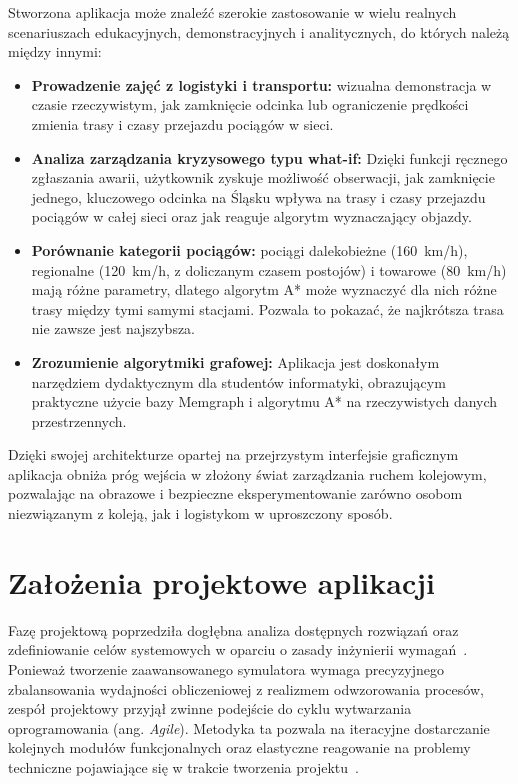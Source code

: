 \documentclass[twoside]{projektInzynierskiMS1z}
\begin{document}
Stworzona aplikacja może znaleźć szerokie zastosowanie w wielu realnych scenariuszach
edukacyjnych, demonstracyjnych i analitycznych, do których należą między innymi:

\begin{itemize}
\item \textbf{Prowadzenie zajęć z logistyki i transportu:} wizualna demonstracja
w czasie rzeczywistym, jak zamknięcie odcinka lub ograniczenie prędkości zmienia
trasy i czasy przejazdu pociągów w sieci.

\item \textbf{Analiza zarządzania kryzysowego typu what-if:} Dzięki funkcji ręcznego zgłaszania awarii, użytkownik zyskuje możliwość obserwacji,
jak zamknięcie jednego, kluczowego odcinka na Śląsku wpływa na trasy i czasy przejazdu pociągów w całej sieci oraz jak reaguje algorytm wyznaczający objazdy.

\item \textbf{Porównanie kategorii pociągów:} pociągi dalekobieżne (160~km/h),
regionalne (120~km/h, z doliczanym czasem postojów) i towarowe (80~km/h) mają
różne parametry, dlatego algorytm A* może wyznaczyć dla nich różne trasy między
tymi samymi stacjami. Pozwala to pokazać, że najkrótsza trasa nie zawsze jest
najszybsza.

\item \textbf{Zrozumienie algorytmiki grafowej:} Aplikacja jest doskonałym narzędziem
dydaktycznym dla studentów informatyki, obrazującym praktyczne użycie bazy Memgraph
i algorytmu A* na rzeczywistych danych przestrzennych.
\end{itemize}

Dzięki swojej architekturze opartej na przejrzystym interfejsie graficznym aplikacja
obniża próg wejścia w złożony świat zarządzania ruchem kolejowym, pozwalając na obrazowe i
bezpieczne eksperymentowanie zarówno osobom niezwiązanym z koleją, jak i logistykom w uproszczony sposób.

\section{Założenia projektowe aplikacji}

Fazę projektową poprzedziła dogłębna analiza dostępnych rozwiązań
oraz zdefiniowanie celów systemowych w oparciu o zasady inżynierii
wymagań~\cite{sommerville2016}. Ponieważ tworzenie zaawansowanego symulatora wymaga
precyzyjnego zbalansowania wydajności obliczeniowej z realizmem odwzorowania procesów,
zespół projektowy przyjął zwinne podejście do cyklu wytwarzania oprogramowania
(ang. \emph{Agile}). Metodyka ta pozwala na iteracyjne dostarczanie kolejnych
modułów funkcjonalnych oraz elastyczne reagowanie na problemy techniczne pojawiające
się w trakcie tworzenia projektu~\cite{agilemanifesto}.
\end{document}
